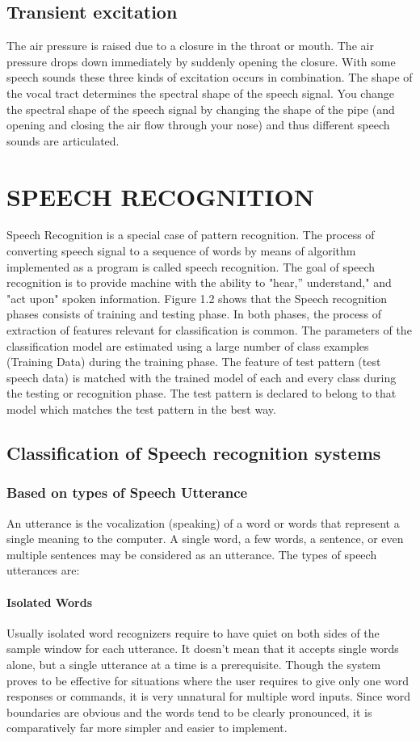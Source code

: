 \documentclass[a4paper,12pt]{report} %
\begin{document}
\subsection{Transient excitation}
 The air pressure is raised due to a closure in the throat or mouth. The air pressure drops down immediately by suddenly opening the closure. With some speech sounds these three kinds of excitation occurs in combination. The shape of the vocal tract determines the spectral shape of the speech signal. You change the spectral shape of the speech signal by changing the shape of the pipe (and opening and closing the air flow through your nose) and thus different speech sounds are articulated.
 
 \section{SPEECH RECOGNITION }
 Speech Recognition is a special case of pattern recognition. The process of converting speech signal to a sequence of words by means of algorithm implemented as a program is called speech recognition. The goal of speech recognition is to provide machine with the ability to "hear,” understand," and "act upon" spoken information. Figure 1.2 shows that the  Speech recognition phases consists of training and testing phase. In both phases, the process of extraction of features relevant for classification is common. The parameters of the classification model are estimated using a large number of class examples (Training Data) during the training phase. The feature of test pattern (test speech data) is matched with the trained model of each and every class during the testing or recognition phase. The test pattern is declared to belong to that model which matches the test pattern in the best way.
 \subsection{Classification of Speech recognition systems }
 \subsubsection{Based on types of Speech Utterance}
          An utterance is the vocalization (speaking) of a word or words that represent a single meaning to the computer. A single word, a few words, a sentence, or even multiple sentences may be considered as an utterance. The types of speech utterances are: 
\paragraph{Isolated Words}
          Usually isolated word recognizers require to have quiet on both sides of the sample window for each utterance. It doesn't mean that it accepts single words alone, but a single utterance at a time is a prerequisite. Though the system proves to be effective for situations where the user requires to give only one word responses or commands, it is very unnatural for multiple word inputs. Since word boundaries are obvious and the words tend to be clearly pronounced, it is comparatively far more simpler and easier to implement. 
\end{document}
